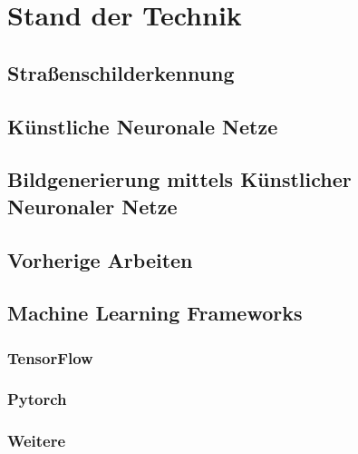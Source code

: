 \chapter{Stand der Technik}
\section{Straßenschilderkennung}


\section{Künstliche Neuronale Netze}


\section{Bildgenerierung mittels Künstlicher Neuronaler Netze}


%

\section{Vorherige Arbeiten}


\section{Machine Learning Frameworks}
\subsection{TensorFlow}
\subsection{Pytorch}
\subsection{Weitere}
